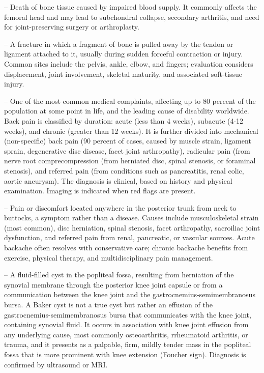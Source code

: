 -- Death of bone tissue caused by impaired blood supply. It commonly affects the femoral head and may lead to subchondral collapse, secondary arthritis, and need for joint-preserving surgery or arthroplasty.

-- A fracture in which a fragment of bone is pulled away by the tendon or ligament attached to it, usually during sudden forceful contraction or injury. Common sites include the pelvis, ankle, elbow, and fingers; evaluation considers displacement, joint involvement, skeletal maturity, and associated soft-tissue injury.

-- One of the most common medical complaints, affecting up to 80 percent of the population at some point in life, and the leading cause of disability worldwide. Back pain is classified by duration: acute (less than 4 weeks), subacute (4-12 weeks), and chronic (greater than 12 weeks). It is further divided into mechanical (non-specific) back pain (90 percent of cases, caused by muscle strain, ligament sprain, degenerative disc disease, facet joint arthropathy), radicular pain (from nerve root comprecompression (from herniated disc, spinal stenosis, or foraminal stenosis), and referred pain (from conditions such as pancreatitis, renal colic, aortic aneurysm). The diagnosis is clinical, based on history and physical examination. Imaging is indicated when red flags are present.

-- Pain or discomfort located anywhere in the posterior trunk from neck to buttocks, a symptom rather than a disease. Causes include musculoskeletal strain (most common), disc herniation, spinal stenosis, facet arthropathy, sacroiliac joint dysfunction, and referred pain from renal, pancreatic, or vascular sources. Acute backache often resolves with conservative care; chronic backache benefits from exercise, physical therapy, and multidisciplinary pain management.

-- A fluid-filled cyst in the popliteal fossa, resulting from herniation of the synovial membrane through the posterior knee joint capsule or from a communication between the knee joint and the gastrocnemius-semimembranosus bursa. A Baker cyst is not a true cyst but rather an effusion of the gastrocnemius-semimembranosus bursa that communicates with the knee joint, containing synovial fluid. It occurs in association with knee joint effusion from any underlying cause, most commonly osteoarthritis, rrheumatoid arthritis, or trauma, and it presents as a palpable, firm, mildly tender mass in the popliteal fossa that is more prominent with knee extension (Foucher sign). Diagnosis is confirmed by ultrasound or MRI.

